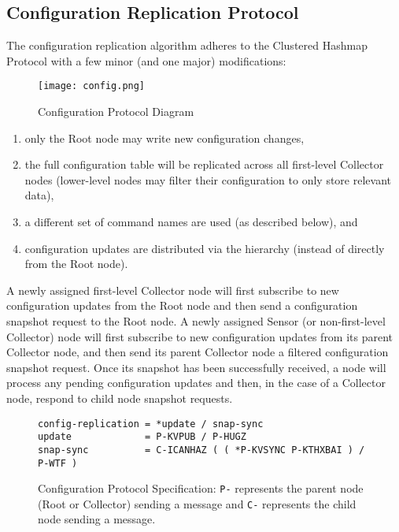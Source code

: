 \subsection{Configuration Replication Protocol}
\label{proto_config}

The \dcamp configuration replication algorithm adheres to the Clustered Hashmap Protocol\cite{chp} with a few minor
(and one major) modifications:

\begin{figure}[ht]
    \centering
    \texttt{[image: config.png]}
    \caption{Configuration Protocol Diagram}
    \label{fig:proto_config_image}
\end{figure}

\begin{enumerate}
\item only the Root node may write new configuration changes,
\item the full configuration table will be replicated across all first-level Collector nodes (lower-level nodes may
      filter their configuration to only store relevant data),
\item a different set of command names are used (as described below), and
\item configuration updates are distributed via the \dcamp hierarchy (instead of directly from the Root node).
\end{enumerate}

A newly assigned first-level Collector node will first subscribe to new configuration updates from the Root node and
then send a configuration snapshot request to the Root node. A newly assigned Sensor (or non-first-level Collector) node
will first subscribe to new configuration updates from its parent Collector node, and then send its parent Collector
node a filtered configuration snapshot request. Once its snapshot has been successfully received, a node will process
any pending configuration updates and then, in the case of a Collector node, respond to child node snapshot requests.

\begin{figure}[ht]
\vspace{+10pt}
\begin{verbatim}
config-replication = *update / snap-sync
update             = P-KVPUB / P-HUGZ
snap-sync          = C-ICANHAZ ( ( *P-KVSYNC P-KTHXBAI ) / P-WTF )
\end{verbatim}
\vspace{-5pt}
\caption[Configuration Protocol Specification]
	{Configuration Protocol Specification: \texttt{P-} represents the parent node (Root or Collector) sending a
	 message and \texttt{C-} represents the child node sending a message.}
\label{fig:proto_config_spec}
\end{figure}

